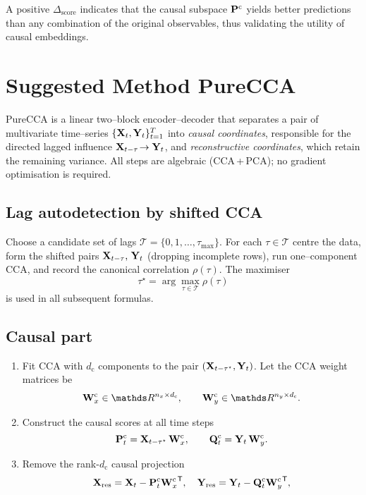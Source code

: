 \documentclass[14pt]{extarticle}
\begin{document}
	A positive \(\Delta_{\text{score}}\) indicates that the causal subspace
	\(\mathbf{P}^{\mathrm c}\) yields better predictions than any combination
	of the original observables, thus validating the utility of causal embeddings.
	
	
	\section{Suggested Method PureCCA} \label{sec:purecca}
	
	PureCCA is a linear two–block encoder–decoder that separates a pair of
	multivariate time–series \(\{\mathbf{X}_t ,\mathbf{Y}_t\}_{t=1}^{T}\) into
	\emph{causal coordinates}, responsible for the directed lagged influence
	\(\mathbf{X}_{t-\tau}\!\to\mathbf{Y}_t\), and \emph{reconstructive coordinates}, which
	retain the remaining variance.  
	All steps are algebraic (CCA\,+\,PCA); no gradient optimisation is
	required.
	
	\subsection*{Lag autodetection by shifted CCA}
	
	Choose a candidate set of lags
	\(\mathcal{T}=\{0,1,\dots,\tau_{\max}\}\).  
	For each \(\tau\in\mathcal{T}\) centre the data,
	form the shifted pairs
	\(\mathbf{X}_{t-\tau},\,\mathbf{Y}_t\) (dropping incomplete rows), run one–component
	CCA, and record the canonical correlation \(\rho(\tau)\).  
	The maximiser
	\[
	\tau^{\star}=\arg\max_{\tau\in\mathcal{T}}\rho(\tau)
	\]
	is used in all subsequent formulas.
	
	\subsection*{Causal part}
	
	\begin{enumerate}[leftmargin=1.4cm,label=(C\arabic*)]
		\item
		Fit CCA with \(d_{\mathrm c}\) components to the
		pair \((\mathbf{X}_{t-\tau^{\star}},\mathbf{Y}_t)\).  
		Let the CCA weight matrices be
		\[
		\bW_x^{\mathrm c}\in\dR^{n_x\times d_{\mathrm c}},
		\qquad
		\bW_y^{\mathrm c}\in\dR^{n_y\times d_{\mathrm c}}.
		\]
		\item
		Construct the causal scores at all time steps
		\[
		\mathbf{P}_t^{\mathrm c}= \mathbf{X}_{t-\tau^{\star}}\,\mathbf{W}_x^{\mathrm c},
		\qquad
		\mathbf{Q}_t^{\mathrm c}= \mathbf{Y}_t\,\mathbf{W}_y^{\mathrm c}.
		\]
		\item Remove the rank-\(d_{\mathrm c}\) causal projection
		\[
		\mathbf{X}_{\text{res}}
		= \mathbf{X}_t - \mathbf{P}_t^{\mathrm c}{\mathbf{W}_x^{\mathrm c}}^{\mathsf{T}},\quad
		\mathbf{Y}_{\text{res}}
		= \mathbf{Y}_t - \mathbf{Q}_t^{\mathrm c}{\mathbf{W}_y^{\mathrm c}}^{\mathsf{T}},
		\]
	\end{enumerate}
	
\end{document}
